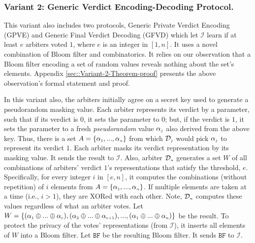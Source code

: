 \vspace{-2mm}
\subsubsection{Variant 2: Generic Verdict  Encoding-Decoding Protocol.} This variant also includes two protocols, Generic Private Verdict Encoding (GPVE) and Generic Final Verdict Decoding (GFVD) which   let $\mathcal{I}$ learn if at least $e$ arbiters voted $1$, where $e$ is an integer in  $[1, n]$. It  uses a novel combination of   Bloom filter and combinatorics. It  relies on our observation that a Bloom filter  encoding a set of random values reveals nothing about the set's elements.  Appendix \ref{sec::Variant-2-Theorem-proof} presents the above observation's formal statement and  proof.  

In this variant  also, the arbiters initially agree on a secret key  used  to  generate a pseudorandom masking value. Each arbiter represents its verdict by a parameter, such that if its verdict is $0$,   it  sets the parameter to  $0$; but, if   the verdict is $1$, it sets the parameter to a fresh \emph{pseudorandom} value $\alpha_{\scriptscriptstyle j}$ also derived from the above key. Thus, there is a set $A=\{\alpha_{\scriptscriptstyle 1},..., \alpha_{\scriptscriptstyle n}\}$ from which  $\mathcal{D}_{\scriptscriptstyle j}$ would pick $\alpha_{\scriptscriptstyle j}$ to represent its verdict $1$. Each arbiter masks its verdict representation by its masking  value. It sends the result to $\mathcal{I}$. Also, arbiter $\mathcal{D}_{\scriptscriptstyle n}$  generates a set $W$  of all  combinations of arbiters' verdict $1$'s representations that satisfy the threshold, $e$.  Specifically,  for every integer $i$ in $[e, n]$, it computes the combinations (without repetition) of $i$ elements from  $A=\{\alpha_{\scriptscriptstyle 1},..., \alpha_{\scriptscriptstyle n}\}$. If  multiple elements are taken at a time (i.e., $i>1$), they are XORed with each other.   Note, $\mathcal{D}_{\scriptscriptstyle n}$ computes these values    regardless of what an  arbiter  votes.   Let $W=\{(\alpha_{\scriptscriptstyle 1}\oplus ... \oplus \alpha_{\scriptscriptstyle e}),  (\alpha_{\scriptscriptstyle 2}\oplus  ... \oplus \alpha_{\scriptscriptstyle e+1}), ..., (\alpha_{\scriptscriptstyle 1}\oplus ... \oplus \alpha_{\scriptscriptstyle n})\}$ be the result. To protect  the privacy of  the votes' representations (from $\mathcal{I}$), it inserts all elements of $W$ into a Bloom filter. Let $\mathtt{BF}$ be the resulting Bloom filter. It sends $\mathtt{BF}$ to $\mathcal{I}$. 


